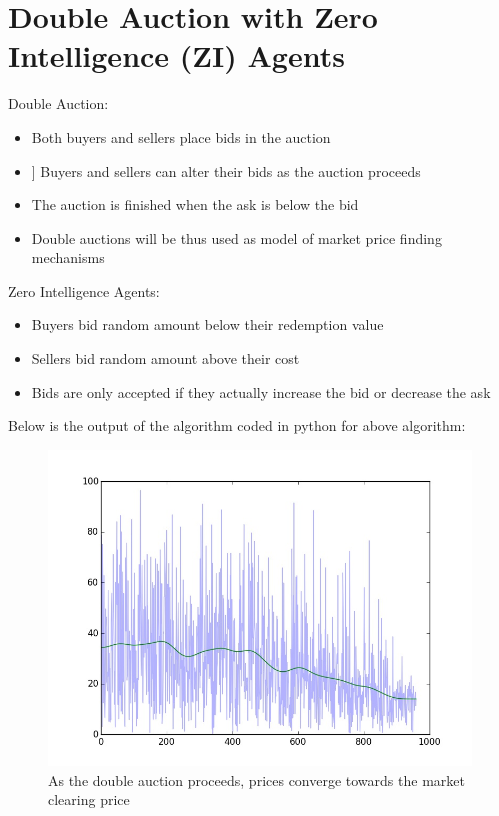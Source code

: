 \documentclass[10pt,a4paper,oneside]{report}
\begin{document}
\section{Double Auction with Zero Intelligence (ZI) Agents \citep{dong2014double}}
Double Auction:
\begin{itemize}
\item Both buyers and sellers place bids in the auction
\item] Buyers and sellers can alter their bids as the auction proceeds
\item The auction is finished when the ask is below the bid
\item Double auctions will be thus used as model of market price finding mechanisms
\end{itemize}
Zero Intelligence Agents:
\begin{itemize}
\item Buyers bid random amount below their redemption value
\item Sellers bid random amount above their cost
\item Bids are only accepted if they actually increase the bid or decrease the ask
\end{itemize}
Below is the output of the algorithm coded in python for above algorithm:
\begin{figure}[H]
\centering
\includegraphics[scale=0.4]{figure_1.jpg}
\caption{As the double auction proceeds, prices converge towards the market clearing price \citep{gjerstad1998price}}
\label{fig:univerise}
\end{figure}
\end{document}
